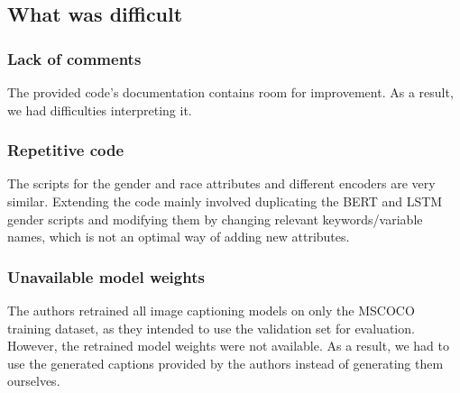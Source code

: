 \subsection{What was difficult} \label{sec:difficult}%

\subsubsection{Lack of comments} %
The provided code's documentation contains room for improvement. As a result, we had difficulties interpreting it.
\vspace*{-0.5cm}
\subsubsection{Repetitive code}
The scripts for the gender and race attributes and different encoders are very similar. Extending the code mainly involved duplicating the BERT and LSTM gender scripts and modifying them by changing relevant keywords/variable names, which is not an optimal way of adding new attributes. 


\vspace*{-0.5cm}
\subsubsection{Unavailable model weights} The authors retrained all image captioning models on only the MSCOCO training dataset, as they intended to use the validation set for evaluation. However, the retrained model weights were not available. As a result, we had to use the generated captions provided by the authors instead of generating them ourselves.


